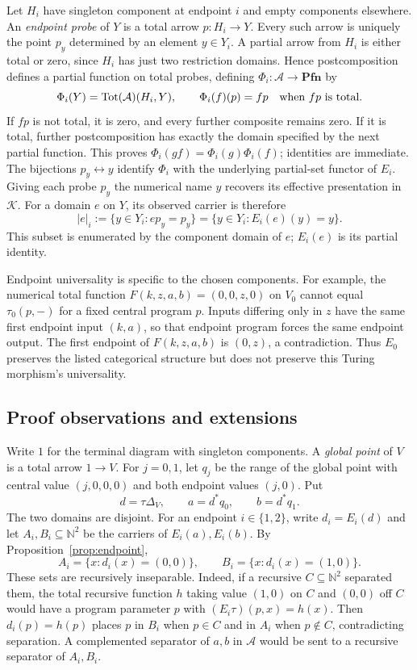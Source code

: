 \documentclass[11pt]{article}
\newcommand{\N}{\mathbb N}
\newcommand{\Pfn}{\mathbf{Pfn}}
\begin{document}
Let $H_i$ have singleton component at endpoint $i$ and empty
components elsewhere. An \emph{endpoint probe} of $Y$ is a total
arrow $p:H_i\to Y$. Every such arrow is uniquely
the point $p_y$ determined by an element $y\in Y_i$. A partial
arrow from $H_i$ is either total or zero, since $H_i$ has just
two restriction domains. Hence postcomposition defines a partial
function on total probes, defining $\Phi_i:\mathcal A\to\Pfn$ by
\[
 \Phi_i(Y)=\operatorname{Tot}(\mathcal A)(H_i,Y),\qquad
 \Phi_i(f)(p)=fp\quad\hbox{when }fp\hbox{ is total}.
\]
If $fp$ is not total, it is zero, and every further composite
remains zero. If it is total, further postcomposition has exactly
the domain specified by the next partial function. This proves
$\Phi_i(gf)=\Phi_i(g)\Phi_i(f)$; identities are immediate.
The bijections $p_y\leftrightarrow y$ identify $\Phi_i$ with the
underlying partial-set functor of $E_i$. Giving each probe $p_y$
the numerical name $y$ recovers its effective presentation in
$\mathcal K$.
For a domain $e$ on $Y$, its observed carrier is therefore
\begin{equation}\label{eq:probe-domain}
 |e|_i:=\{y\in Y_i:ep_y=p_y\}
       =\{y\in Y_i:E_i(e)(y)=y\}.
\end{equation}
This subset is enumerated by the component domain of $e$;
$E_i(e)$ is its partial identity.

Endpoint universality is specific to the chosen components.
For example, the numerical total function
$F(k,z,a,b)=(0,0,z,0)$ on $V_0$ cannot equal
$\tau_0(p,-)$ for a fixed central program $p$.
Inputs differing only in $z$ have the same first endpoint input
$(k,a)$, so that endpoint program forces the same endpoint output.
The first endpoint of $F(k,z,a,b)$ is $(0,z)$, a contradiction.
Thus $E_0$ preserves the listed categorical structure but does
not preserve this Turing morphism's universality.

\subsection{Proof observations and extensions}

Write $1$ for the terminal diagram with singleton components.
A \emph{global point} of $V$ is a total arrow $1\to V$.
For $j=0,1$, let $q_j$ be the range of the global point
with central value $(j,0,0,0)$ and both endpoint values $(j,0)$.
Put
\[
 d=\tau\Delta_V,\qquad a=d^*q_0,\qquad b=d^*q_1.
\]
The two domains are disjoint. For an endpoint $i\in\{1,2\}$,
write $d_i=E_i(d)$ and let $A_i,B_i\subseteq\N^2$ be the
carriers of $E_i(a),E_i(b)$. By Proposition~\ref{prop:endpoint},
\[
 A_i=\{x:d_i(x)=(0,0)\},\qquad
 B_i=\{x:d_i(x)=(1,0)\}.
\]
These sets are recursively inseparable. Indeed, if a recursive
$C\subseteq\N^2$ separated them, the total recursive function
$h$ taking value $(1,0)$ on $C$ and $(0,0)$ off $C$ would have
a program parameter $p$ with $(E_i\tau)(p,x)=h(x)$.
Then $d_i(p)=h(p)$ places $p$ in $B_i$ when $p\in C$
and in $A_i$ when $p\notin C$, contradicting separation.
A complemented separator of $a,b$ in $\mathcal A$ would be
sent to a recursive separator of $A_i,B_i$.
\end{document}
